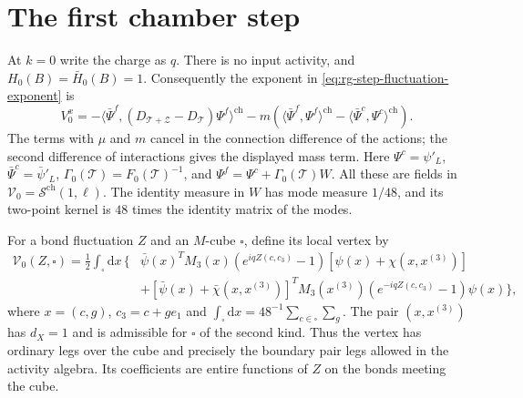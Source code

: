 \documentclass[11pt,letterpaper,reqno]{amsart}
\newcommand{\Sspace}{\mathcal S}
\newcommand{\dd}{\mathrm d}
\begin{document}
\section{The first chamber step}\label{subsec:rg-step-first-vertex}

At $k=0$ write the charge as $q$.
There is no input activity, and $H_0(B)=\bar H_0(B)=1$.
Consequently the exponent in
\eqref{eq:rg-step-fluctuation-exponent} is
\begin{equation}\label{eq:rg-step-first-exponent}
 V_0^x=
  -\langle\bar\Psi^f,(D_{\mathscr T+\mathscr Z}
                                    -D_{\mathscr T})\Psi^f\rangle^{\mathrm{ch}}
  -m\left(\langle\bar\Psi^f,\Psi^f\rangle^{\mathrm{ch}}
                   -\langle\bar\Psi^c,\Psi^c\rangle^{\mathrm{ch}}\right).
\end{equation}
The terms with $\mu$ and $m$ cancel in the connection
difference of the actions; the second difference
of interactions gives the displayed mass term.
Here $\Psi^c=\psi'_L$, $\bar\Psi^c=\bar\psi'_L$,
$\Gamma_0(\mathscr T)=F_0(\mathscr T)^{-1}$,
and $\Psi^f=\Psi^c+\Gamma_0(\mathscr T)W$.
All these are fields in $\mathscr V_0=\Sspace^{\mathrm{ch}}(1,\ell)$.
The identity measure in $W$ has mode measure $1/48$,
and its two-point kernel is $48$ times the identity
matrix of the modes.

For a bond fluctuation $Z$ and an $M$-cube $\square$,
define its local vertex by
\begin{equation}\label{eq:rg-step-first-vertex}
 \begin{split}
 \mathcal V_0(Z,\square)=\frac12\int_\square\dd x\,
   \Big\{&
    \bar\psi(x)^TM_3(x)(e^{iqZ(c,c_3)}-1)
                                  [\psi(x)+\chi(x,x^{(3)})]\\
    &+[\bar\psi(x)+\bar\chi(x,x^{(3)})]^T
               M_3(x^{(3)})(e^{-iqZ(c,c_3)}-1)\psi(x)\Big\},
 \end{split}
\end{equation}
where $x=(c,g)$, $c_3=c+ge_1$ and
$\int_\square\dd x=48^{-1}\sum_{c\in\square}\sum_g$.
The pair $(x,x^{(3)})$ has $d_X=1$ and is admissible
for $\square$ of the second kind. Thus the vertex
has ordinary legs over the cube and precisely the
boundary pair legs allowed in the activity algebra.
Its coefficients are entire functions of $Z$ on
the bonds meeting the cube.
\end{document}
